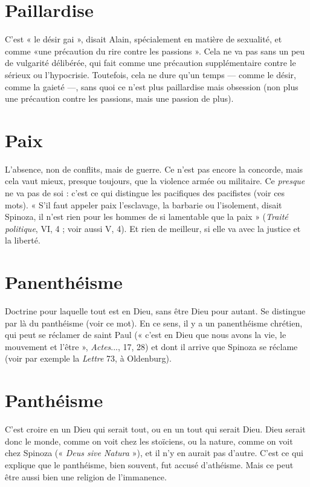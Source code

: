 \section{Paillardise}
C'est « le désir gai », disait Alain, spécialement en matière de
sexualité, et comme «une précaution du rire contre les
passions ». Cela ne va pas sans un peu de vulgarité délibérée, qui fait comme
une précaution supplémentaire contre le sérieux ou l’hypocrisie. Toutefois, cela
ne dure qu’un temps — comme le désir, comme la gaieté —, sans quoi ce n’est
plus paillardise mais obsession (non plus une précaution contre les passions,
mais une passion de plus).

\section{Paix}
L’absence, non de conflits, mais de guerre. Ce n’est pas encore la
concorde, mais cela vaut mieux, presque toujours, que la violence
armée ou militaire. Ce {\it presque} ne va pas de soi : c’est ce qui distingue les pacifiques
des pacifistes (voir ces mots). « S’il faut appeler paix l’esclavage, la barbarie
ou l'isolement, disait Spinoza, il n’est rien pour les hommes de si lamentable
que la paix » ({\it Traité politique}, VI, 4 ; voir aussi V, 4). Et rien de meilleur,
si elle va avec la justice et la liberté.

\section{Panenthéisme}
Doctrine pour laquelle tout est en Dieu, sans être Dieu
pour autant. Se distingue par là du panthéisme (voir ce
mot). En ce sens, il y a un panenthéisme chrétien, qui peut se réclamer de saint
Paul (« c’est en Dieu que nous avons la vie, le mouvement et l’être », {\it Actes}...,
17, 28) et dont il arrive que Spinoza se réclame (voir par exemple la {\it Lettre} 73,
à Oldenburg).

\section{Panthéisme}
C’est croire en un Dieu qui serait tout, ou en un tout qui
serait Dieu. Dieu serait donc le monde, comme on voit
chez les stoïciens, ou la nature, comme on voit chez Spinoza (« {\it Deus sive
Natura} »), et il n’y en aurait pas d’autre. C’est ce qui explique que le panthéisme,
bien souvent, fut accusé d’athéisme. Mais ce peut être aussi bien une
religion de l’immanence.


